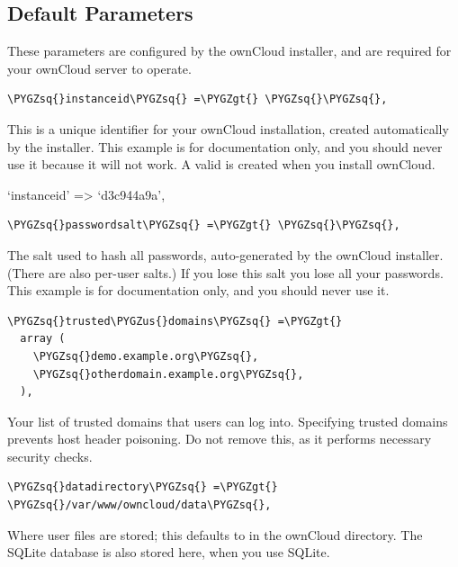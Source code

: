 \documentclass[letterpaper,10pt,english]{sphinxmanual}
\def\PYGZus{\char`\_}
\def\PYGZgt{\char`\>}
\def\PYGZsq{\char`\'}
\begin{document}
\subsection{Default Parameters}
\label{configuration_server/config_sample_php_parameters:default-parameters}
These parameters are configured by the ownCloud installer, and are required
for your ownCloud server to operate.

\begin{Verbatim}[commandchars=\\\{\}]
\PYGZsq{}instanceid\PYGZsq{} =\PYGZgt{} \PYGZsq{}\PYGZsq{},
\end{Verbatim}

This is a unique identifier for your ownCloud installation, created
automatically by the installer. This example is for documentation only,
and you should never use it because it will not work. A valid 
is created when you install ownCloud.

`instanceid' =\textgreater{} `d3c944a9a',

\begin{Verbatim}[commandchars=\\\{\}]
\PYGZsq{}passwordsalt\PYGZsq{} =\PYGZgt{} \PYGZsq{}\PYGZsq{},
\end{Verbatim}

The salt used to hash all passwords, auto-generated by the ownCloud
installer. (There are also per-user salts.) If you lose this salt you lose
all your passwords. This example is for documentation only, and you should
never use it.

\begin{Verbatim}[commandchars=\\\{\}]
\PYGZsq{}trusted\PYGZus{}domains\PYGZsq{} =\PYGZgt{}
  array (
    \PYGZsq{}demo.example.org\PYGZsq{},
    \PYGZsq{}otherdomain.example.org\PYGZsq{},
  ),
\end{Verbatim}

Your list of trusted domains that users can log into. Specifying trusted
domains prevents host header poisoning. Do not remove this, as it performs
necessary security checks.

\begin{Verbatim}[commandchars=\\\{\}]
\PYGZsq{}datadirectory\PYGZsq{} =\PYGZgt{} \PYGZsq{}/var/www/owncloud/data\PYGZsq{},
\end{Verbatim}

Where user files are stored; this defaults to  in the ownCloud
directory. The SQLite database is also stored here, when you use SQLite.
\end{document}
